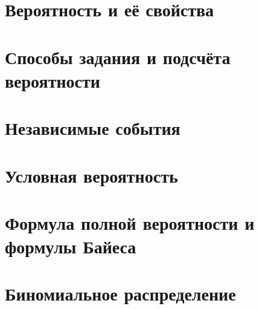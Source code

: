 \section{Вероятность и её свойства} %
% 

\section{Способы задания и подсчёта вероятности} %
% 






\section{Независимые события} %
% 

\section{Условная вероятность} %


\section{Формула полной вероятности и формулы Байеса}

\section{Биномиальное распределение}

